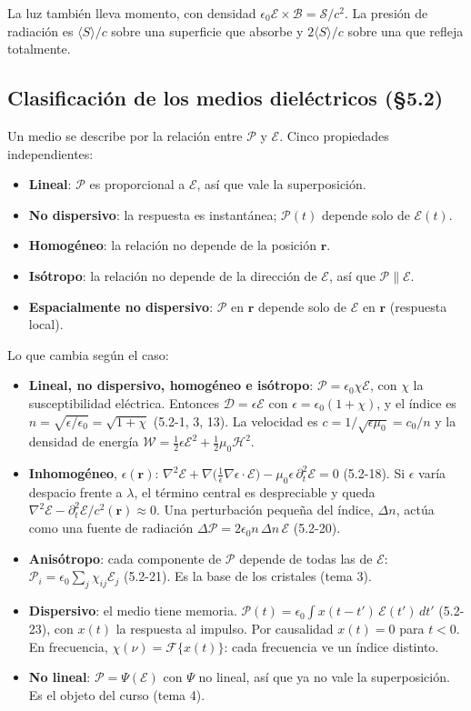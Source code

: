 \documentclass[10pt]{article}
\newcommand{\Ec}{\boldsymbol{\mathcal E}}
\newcommand{\Dc}{\boldsymbol{\mathcal D}}
\newcommand{\Bc}{\boldsymbol{\mathcal B}}
\newcommand{\Pc}{\boldsymbol{\mathcal P}}
\newcommand{\Sc}{\boldsymbol{\mathcal S}}
\newcommand{\rv}{\mathbf r}
\begin{document}
La luz también lleva momento, con densidad $\epsilon_0\Ec\times\Bc=\Sc/c^2$. La presión de radiación es $\langle S\rangle/c$ sobre una superficie que absorbe y $2\langle S\rangle/c$ sobre una que refleja totalmente.

\subsection{Clasificación de los medios dieléctricos (§5.2)}
Un medio se describe por la relación entre $\Pc$ y $\Ec$. Cinco propiedades independientes:
\begin{itemize}
\item \textbf{Lineal}: $\Pc$ es proporcional a $\Ec$, así que vale la superposición.
\item \textbf{No dispersivo}: la respuesta es instantánea; $\Pc(t)$ depende solo de $\Ec(t)$.
\item \textbf{Homogéneo}: la relación no depende de la posición $\rv$.
\item \textbf{Isótropo}: la relación no depende de la dirección de $\Ec$, así que $\Pc\parallel\Ec$.
\item \textbf{Espacialmente no dispersivo}: $\Pc$ en $\rv$ depende solo de $\Ec$ en $\rv$ (respuesta local).
\end{itemize}

Lo que cambia según el caso:
\begin{itemize}
\item \textbf{Lineal, no dispersivo, homogéneo e isótropo}: $\Pc=\epsilon_0\chi\Ec$, con $\chi$ la susceptibilidad eléctrica. Entonces $\Dc=\epsilon\Ec$ con $\epsilon=\epsilon_0(1+\chi)$, y el índice es $n=\sqrt{\epsilon/\epsilon_0}=\sqrt{1+\chi}$ (5.2-1, 3, 13). La velocidad es $c=1/\sqrt{\epsilon\mu_0}=c_0/n$ y la densidad de energía $\mathcal W=\tfrac12\epsilon\mathcal E^2+\tfrac12\mu_0\mathcal H^2$.
\item \textbf{Inhomogéneo}, $\epsilon(\rv)$: $\nabla^2\Ec+\nabla\big(\tfrac1\epsilon\nabla\epsilon\cdot\Ec\big)-\mu_0\epsilon\,\partial_t^2\Ec=0$ (5.2-18). Si $\epsilon$ varía despacio frente a $\lambda$, el término central es despreciable y queda $\nabla^2\Ec-\partial_t^2\Ec/c^2(\rv)\approx0$. Una perturbación pequeña del índice, $\Delta n$, actúa como una fuente de radiación $\Delta\Pc=2\epsilon_0n\,\Delta n\,\Ec$ (5.2-20).
\item \textbf{Anisótropo}: cada componente de $\Pc$ depende de todas las de $\Ec$: $\mathcal P_i=\epsilon_0\sum_j\chi_{ij}\mathcal E_j$ (5.2-21). Es la base de los cristales (tema 3).
\item \textbf{Dispersivo}: el medio tiene memoria. $\Pc(t)=\epsilon_0\!\int x(t-t')\,\Ec(t')\,dt'$ (5.2-23), con $x(t)$ la respuesta al impulso. Por causalidad $x(t)=0$ para $t<0$. En frecuencia, $\chi(\nu)=\mathcal F\{x(t)\}$: cada frecuencia ve un índice distinto.
\item \textbf{No lineal}: $\Pc=\Psi(\Ec)$ con $\Psi$ no lineal, así que ya no vale la superposición. Es el objeto del curso (tema 4).
\end{itemize}
\end{document}
